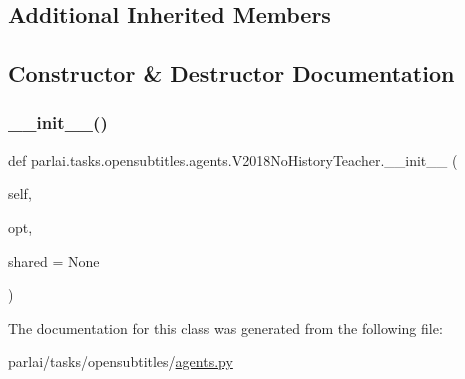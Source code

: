 \subsection*{Additional Inherited Members}


\subsection{Constructor \& Destructor Documentation}
\mbox{\label{classparlai_1_1tasks_1_1opensubtitles_1_1agents_1_1V2018NoHistoryTeacher_a8341ce8f3cf5d53180d47db11ac0d397}} 
\subsubsection{\texorpdfstring{\+\_\+\+\_\+init\+\_\+\+\_\+()}{\_\_init\_\_()}}
{\footnotesize\ttfamily def parlai.\+tasks.\+opensubtitles.\+agents.\+V2018\+No\+History\+Teacher.\+\_\+\+\_\+init\+\_\+\+\_\+ (\begin{DoxyParamCaption}\item[{}]{self,  }\item[{}]{opt,  }\item[{}]{shared = {\ttfamily None} }\end{DoxyParamCaption})}



The documentation for this class was generated from the following file\+:\begin{DoxyCompactItemize}
\item 
parlai/tasks/opensubtitles/\hyperlink{parlai_2tasks_2opensubtitles_2agents_8py}{agents.\+py}\end{DoxyCompactItemize}
